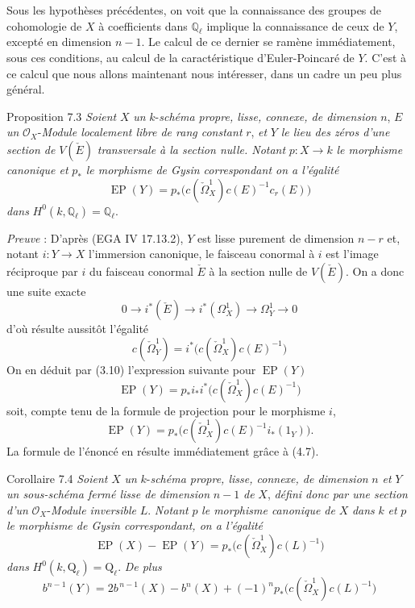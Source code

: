 Sous les hypothèses précédentes, on voit que la connaissance des groupes de cohomologie de $X$ à coefficients dans $\mathbb{Q}_\ell$ implique la connaissance de ceux de $Y$, excepté en dimension $n-1$. Le calcul de ce dernier se ramène immédiatement, sous ces conditions, au calcul de la caractéristique d'Euler-Poincaré de $Y$. C'est à ce calcul que nous allons maintenant nous intéresser, dans un cadre un peu plus général.

\begin{statement}{Proposition 7.3}
\emph{Soient} $X$ \emph{un} $k$-\emph{schéma propre, lisse, connexe, de dimension} $n$, $E$ \emph{un} $\mathcal{O}_X$-\emph{Module localement libre de rang constant} $r$, \emph{et} $Y$ \emph{le lieu des zéros d'une section de} $V(\check E)$ \emph{transversale à la section nulle. Notant} $p:X\to k$ \emph{le morphisme canonique et} $p_*$ \emph{le morphisme de Gysin correspondant on a l'égalité}
\[
\operatorname{EP}(Y)=p_*\bigl(c(\check\Omega_X^1)c(E)^{-1}c_r(E)\bigr)
\]
\emph{dans} $H^0(k,\mathbb{Q}_\ell)=\mathbb{Q}_\ell$.
\end{statement}

\emph{Preuve} : D'après (EGA IV 17.13.2), $Y$ est lisse purement de dimension $n-r$ et, notant $i:Y\to X$ l'immersion canonique, le faisceau conormal à $i$ est l'image réciproque par $i$ du faisceau conormal $\check E$ à la section nulle de $V(\check E)$. On a donc une suite exacte
\[
0\to i^*(\check E)\to i^*(\Omega_X^1)\to\Omega_Y^1\to0
\tag{7.3.1}
\]
d'où résulte aussitôt l'égalité
\[
c(\check\Omega_Y^1)=i^*\bigl(c(\check\Omega_X^1)c(E)^{-1}\bigr)
\tag{7.3.2}
\]
On en déduit par (3.10) l'expression suivante pour $\operatorname{EP}(Y)$
\[
\operatorname{EP}(Y)=p_*i_*i^*\bigl(c(\check\Omega_X^1)c(E)^{-1}\bigr)
\]
soit, compte tenu de la formule de projection pour le morphisme $i$,
\[
\operatorname{EP}(Y)=p_*\bigl(c(\check\Omega_X^1)c(E)^{-1}i_*(1_Y)\bigr).
\]
La formule de l'énoncé en résulte immédiatement grâce à (4.7).

\begin{statement}{Corollaire 7.4}
\emph{Soient} $X$ \emph{un} $k$-\emph{schéma propre, lisse, connexe, de dimension} $n$ \emph{et} $Y$ \emph{un sous-schéma fermé lisse de dimension} $n-1$ \emph{de} $X$, \emph{défini donc par une section d'un} $\mathcal{O}_X$-\emph{Module inversible} $L$. \emph{Notant} $p$ \emph{le morphisme canonique de} $X$ \emph{dans} $k$ \emph{et} $p$ \emph{le morphisme de Gysin correspondant, on a l'égalité}
\[
\operatorname{EP}(X)-\operatorname{EP}(Y)=p_*\bigl(c(\check\Omega_X^1)c(L)^{-1}\bigr)
\tag{7.4.1}
\]
\emph{dans} $H^0(k,\mathrm{Q}_\ell)=\mathrm{Q}_\ell$. \emph{De plus}
\[
b^{n-1}(Y)=2b^{\,n-1}(X)-b^n(X)+(-1)^n p_*\bigl(c(\check\Omega_X^1)c(L)^{-1}\bigr)
\tag{7.4.2}
\]
\end{statement}

